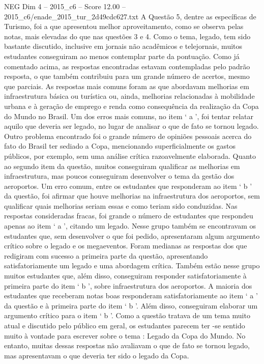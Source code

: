 \begin{textsample}{NEG Dim 4 – 2015\_c6 – Score 12.00 – 2015\_c6/enade\_2015\_tur\_2d49cdc627.txt}
A Questão 5, dentre as específicas de Turismo, foi a que apresentou melhor aproveitamento, como se observa pelas notas, mais elevadas do que nas questões 3 e 4.
Como o tema, legado, tem sido bastante discutido, inclusive em jornais não acadêmicos e telejornais, muitos estudantes conseguiram ao menos contemplar parte da pontuação.
Como já comentado acima, as respostas encontradas estavam contempladas pelo padrão resposta, o que também contribuiu para um grande número de acertos, mesmo que parciais.
As respostas mais comuns foram as que abordavam melhorias em infraestrutura básica ou turística ou, ainda, melhorias relacionadas à mobilidade urbana e à geração de emprego e renda como consequência da realização da Copa do Mundo no Brasil.
Um dos erros mais comuns, no item ‘ a ’, foi tentar relatar aquilo que deveria ser legado, no lugar de analisar o que de fato se tornou legado.
Outro problema encontrado foi o grande número de opiniões pessoais acerca do fato do Brasil ter sediado a Copa, mencionando superficialmente os gastos públicos, por exemplo, sem uma análise crítica razoavelmente elaborada.
Quanto ao segundo item da questão, muitos conseguiram qualificar as melhorias em infraestrutura, mas poucos conseguiram desenvolver o tema da gestão dos aeroportos.
Um erro comum, entre os estudantes que responderam ao item ‘ b ’ da questão, foi afirmar que houve melhorias na infraestrutura dos aeroportos, sem qualificar quais melhorias seriam essas e como teriam sido conduzidas.
Nas respostas consideradas fracas, foi grande o número de estudantes que respondeu apenas ao item ‘ a ’, citando um legado.
Nesse grupo também se encontravam os estudantes que, sem desenvolver o que foi pedido, apresentaram algum argumento crítico sobre o legado e os megaeventos.
Foram medianas as respostas dos que redigiram com sucesso a primeira parte da questão, apresentando satisfatoriamente um legado e uma abordagem crítica.
Também estão nesse grupo muitos estudantes que, além disso, conseguiram responder satisfatoriamente à primeira parte do item ‘ b ’, sobre infraestrutura dos aeroportos.
A maioria dos estudantes que receberam notas boas responderam satisfatoriamente ao item ‘ a ’ da questão e à primeira parte do item ‘ b ’.
Além disso, conseguiram elaborar um argumento crítico para o item ‘ b ’.
Como a questão tratava de um tema muito atual e discutido pelo público em geral, os estudantes parecem ter -se sentido muito à vontade para escrever sobre o tema : Legado da Copa do Mundo.
No entanto, muitas dessas respostas não avaliavam o que de fato se tornou legado, mas apresentavam o que deveria ter sido o legado da Copa.

\end{textsample}

